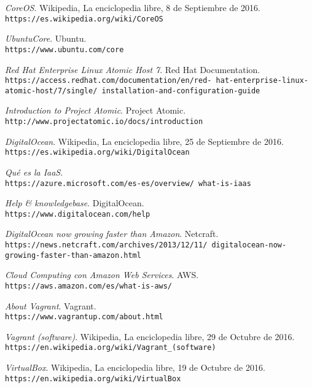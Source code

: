 \begin{thebibliography}{9}
\textit{CoreOS}. 
Wikipedia, La enciclopedia libre, 8 de Septiembre de 2016.
\\\texttt{https://es.wikipedia.org/wiki/CoreOS}

\textit{UbuntuCore}. 
Ubuntu.
\\\texttt{https://www.ubuntu.com/core}

\textit{Red Hat Enterprise Linux Atomic Host 7}. 
Red Hat Documentation.
\\\texttt{https://access.redhat.com/documentation/en/red-
hat-enterprise-linux-atomic-host/7/single/
installation-and-configuration-guide}

\textit{Introduction to Project Atomic}. 
Project Atomic.
\\\texttt{http://www.projectatomic.io/docs/introduction}

\textit{DigitalOcean}. 
Wikipedia, La enciclopedia libre, 25 de Septiembre de 2016.
\\\texttt{https://es.wikipedia.org/wiki/DigitalOcean}

\textit{Qué es la IaaS}.
\\\texttt{https://azure.microsoft.com/es-es/overview/
what-is-iaas}

\textit{Help \& knowledgebase}. 
DigitalOcean.
\\\texttt{https://www.digitalocean.com/help}

\textit{DigitalOcean now growing faster than Amazon}. 
Netcraft.
\\\texttt{https://news.netcraft.com/archives/2013/12/11/
digitalocean-now-growing-faster-than-amazon.html}

\textit{Cloud Computing con Amazon Web Services}. 
AWS.
\\\texttt{https://aws.amazon.com/es/what-is-aws/}

\textit{About Vagrant}. 
Vagrant.
\\\texttt{https://www.vagrantup.com/about.html}

\textit{Vagrant (software)}. 
Wikipedia, La enciclopedia libre, 29 de Octubre de 2016.
\\\texttt{https://en.wikipedia.org/wiki/Vagrant\_(software)}

\textit{VirtualBox}. 
Wikipedia, La enciclopedia libre, 19 de Octubre de 2016.
\\\texttt{https://en.wikipedia.org/wiki/VirtualBox}


\end{thebibliography}
